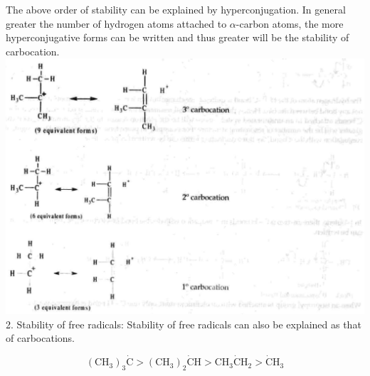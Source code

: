 \documentclass[10pt]{article}
\begin{document}
The above order of stability can be explained by hyperconjugation. In general greater the number of hydrogen atoms attached to $\alpha$-carbon atoms, the more hyperconjugative forms can be written and thus greater will be the stability of carbocation.\\
\includegraphics[max width=\textwidth, center]{2025_01_28_8470952b98110cec3aabg-082(1)}\\
2. Stability of free radicals: Stability of free radicals can also be explained as that of carbocations.

$$
\left(\mathrm{CH}_{3}\right)_{3} \dot{\mathrm{C}}>\left(\mathrm{CH}_{3}\right)_{2} \dot{\mathrm{C}} \mathrm{H}>\mathrm{CH}_{3} \dot{\mathrm{C}} \mathrm{H}_{2}>\dot{\mathrm{C}} \mathrm{H}_{3}
$$
\end{document}
